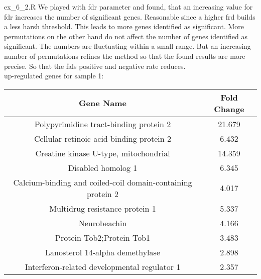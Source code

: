 \documentclass[10pt,a4paper]{article}
\begin{document}
 {ex_6_2.R}
We played with fdr parameter and found, that an increasing value for fdr increases the number of significant genes. Reasonable since a higher frd builds a less harsh threshold. This leads to more genes identified as significant. More permutations on the other hand do not affect the number of genes identified as significant. The numbers are fluctuating within a small range. But an increasing number of permutations refines the method so that the found results are more precise. So that the fals positive and negative rate reduces.\\
 up-regulated genes for sample 1:\\
\begin{tabular}{c | c}
	Gene Name & Fold Change\\
	\hline
	Polypyrimidine tract-binding protein 2                      & 21.679\\
	Cellular retinoic acid-binding protein 2                    & 6.432\\
	Creatine kinase U-type, mitochondrial                       & 14.359\\
	Disabled homolog 1                                          & 6.345\\ 
	Calcium-binding and coiled-coil domain-containing protein 2 & 4.017\\  
	Multidrug resistance protein 1                              & 5.337\\  
	Neurobeachin                                                & 4.166\\  
	Protein Tob2;Protein Tob1                                   & 3.483\\  
	Lanosterol 14-alpha demethylase                             & 2.898\\   
	Interferon-related developmental regulator 1                & 2.357\\
\end{tabular} \\
\end{document}
